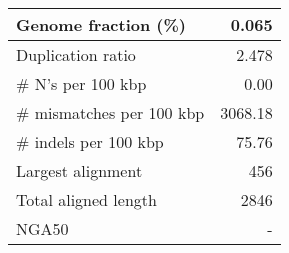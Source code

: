 \documentclass[12pt,a4paper]{article}
\begin{document}
\begin{table}[ht]
\begin{center}
\begin{tabular}{|l*{1}{|r}|}
Genome fraction (\%) & 0.065 \\ \hline
Duplication ratio & 2.478 \\ \hline
\# N's per 100 kbp & 0.00 \\ \hline
\# mismatches per 100 kbp & 3068.18 \\ \hline
\# indels per 100 kbp & 75.76 \\ \hline
Largest alignment & 456 \\ \hline
Total aligned length & 2846 \\ \hline
NGA50 & - \\ \hline
\end{tabular}
\end{center}
\end{table}
\end{document}
